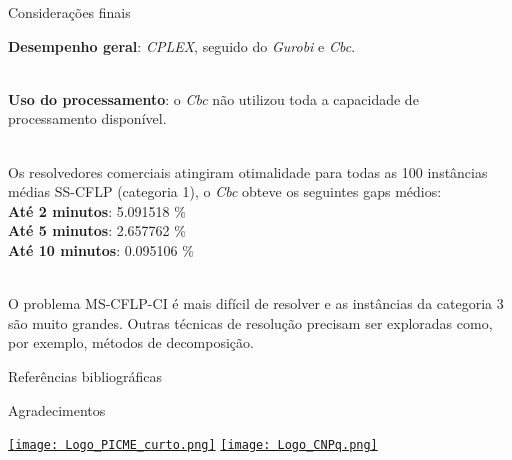 \documentclass[aspectratio=169]{beamer}
\newcommand{ \solver }[1]{\textit{#1}}
\begin{document}
	\begin{frame}{Considerações finais} %
		
		\textbf{Desempenho geral}: 
		\solver{CPLEX}, 
		seguido do \solver{Gurobi} 
		e \solver{Cbc}.  
		
		\hfill \\ \textbf{Uso do processamento}:
		o \solver{Cbc} não utilizou toda a capacidade de processamento disponível.

		\hfill
		\\
		Os resolvedores comerciais atingiram otimalidade para todas as 100 instâncias médias SS-CFLP (categoria 1), o \solver{Cbc} obteve os seguintes gaps médios:		
		\\	\textbf{Até 2 minutos}:	5.091518 \%
		\\	\textbf{Até 5 minutos}:	2.657762 \%
		\\	\textbf{Até 10 minutos}:	0.095106 \%
		
		\hfill \\ O problema MS-CFLP-CI é mais difícil de resolver e as instâncias da categoria 3 são muito grandes.   
		Outras técnicas de resolução precisam ser exploradas como, por exemplo, métodos de decomposição.
		
		
	\end{frame}
	
	
	\begin{frame}{Referências bibliográficas}
		
		
		
		
	\end{frame}
	
	
	
	\begin{frame}{Agradecimentos}
		
		\quad \hfill			
				\href{https://www.uel.br/pos/pgmac/?content=PICME.htm}{\texttt{[image: Logo\_PICME\_curto.png]}}
			\hfill	
				\href{http://cnpq.br/}{\texttt{[image: Logo\_CNPq.png]}}
		\hfill \quad	
	
	
	
	\end{frame}
	
	\begin{frame} %
		\maketitle
	\end{frame}
\end{document}
